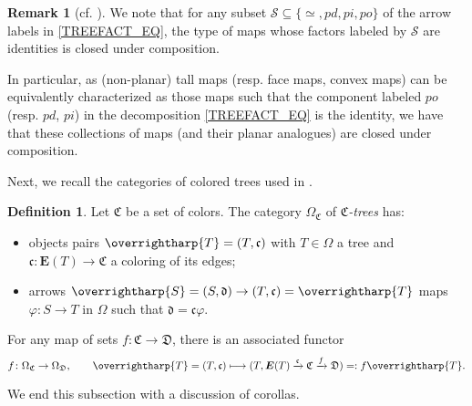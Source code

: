 \documentclass[a4paper,10pt
,draft
]{article}%
\numberwithin{equation}{section}
\numberwithin{figure}{section}
\theoremstyle{definition} %
\newtheorem{definition}[equation]{Definition}%
\newtheorem{remark}[equation]{Remark}%
\newcommand{\vect}[1]{\text{\overrightharp{\ensuremath{#1}}}}
\newcommand{\1}{\ensuremath{\mathbbm 1}}%
\begin{document}
\begin{remark}[{cf. \cite[Rem. \ref{TAS-TODF REM}, \ref{TAS-CNVXM REM}, \ref{TAS-TREEMAPCOMP_REM}]{BP_TAS}}]
        \label{TREEFACTNAMES_REM}
        We note that for any subset
	$\mathcal{S} \subseteq \{\simeq,pd,pi,po\}$
	of the arrow labels 
	in \eqref{TREEFACT_EQ},
	the type of maps whose
	factors labeled by $\mathcal{S}$ are identities 
	is closed under composition.

        In particular, as (non-planar) tall maps (resp. face maps, convex maps) can be equivalently characterized as those maps such that
        the component labeled $po$ (resp. $pd$, $pi$)
        in the decomposition \eqref{TREEFACT_EQ}
        is the identity,
        we have that these collections of maps (and their planar analogues) are closed under composition.
\end{remark}




Next, we recall the categories of colored trees used in 
\cite[Def. \ref{OC-COLFOR DEF}]{BP_FCOP}.

\begin{definition}\label{CTREE_DEF}
        Let $\mathfrak C$ be a set of colors.
        The category $\Omega_{\mathfrak C}$ of \textit{$\mathfrak C$-trees} has:
        \begin{itemize}
        \item objects pairs $\vect T = (T, \mathfrak c)$ with
                $T \in \Omega$ a tree and
                $\mathfrak c \colon \boldsymbol{E}(T) \to \mathfrak C$ a coloring of its edges;
        \item arrows $\vect S = (S, \mathfrak d) \to (T, \mathfrak c) = \vect{T}$ maps
                $\varphi \colon S \to T$ in $\Omega$ such that $\mathfrak d = \mathfrak c \varphi$.
        \end{itemize}
\end{definition}

For any map of sets $f \colon \mathfrak C \to \mathfrak D$, there is an associated functor
\begin{equation}
        \label{TREECHANGEC_EQ}
        f \colon \Omega_{\mathfrak C} \to \Omega_{\mathfrak D},
        \qquad
        \vect T = (T, \mathfrak c)
        \longmapsto
        (T, \boldsymbol{E}(T) \xrightarrow{\mathfrak c} \mathfrak C \xrightarrow{f} \mathfrak D) =: f \vect T.
\end{equation}



We end this subsection with a discussion of corollas.
\end{document}
